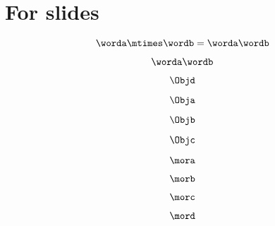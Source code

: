 
\section[For slides]{For slides}

\begin{forslides}

    \begin{equation}
        \label{eq:string-semigroup-wordab-2}
        \worda \mtimes  \wordb =  \worda \wordb
    \end{equation}

    \begin{equation}
        \label{eq:string-semigroup-wordab-concat-2}
        \worda \wordb
    \end{equation}

    \begin{equation}
        \label{eq:semicats-slides-00}
        \Objd
    \end{equation}

    \begin{equation}
        \label{eq:semicats-slides-01}
        \Obja
    \end{equation}

    \begin{equation}
        \label{eq:semicats-slides-02}
        \Objb
    \end{equation}

    \begin{equation}
        \label{eq:ssemicats-slides-03}
        \Objc
    \end{equation}

    \begin{equation}
        \label{eq:semicats-slides-04}
        \mora
    \end{equation}

    \begin{equation}
        \label{eq:semicats-slides-05}
        \morb
    \end{equation}

    \begin{equation}
        \label{eq:semicats-slides-06}
        \morc
    \end{equation}

    \begin{equation}
        \label{eq:semicats-slides-07}
        \mord
    \end{equation}


\end{forslides}
